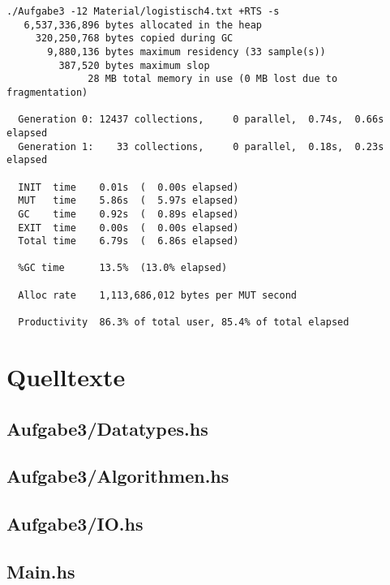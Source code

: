 \documentclass{scrreprt}
\begin{document}
\begin{verbatim}
./Aufgabe3 -12 Material/logistisch4.txt +RTS -s 
   6,537,336,896 bytes allocated in the heap
     320,250,768 bytes copied during GC
       9,880,136 bytes maximum residency (33 sample(s))
         387,520 bytes maximum slop
              28 MB total memory in use (0 MB lost due to fragmentation)

  Generation 0: 12437 collections,     0 parallel,  0.74s,  0.66s elapsed
  Generation 1:    33 collections,     0 parallel,  0.18s,  0.23s elapsed

  INIT  time    0.01s  (  0.00s elapsed)
  MUT   time    5.86s  (  5.97s elapsed)
  GC    time    0.92s  (  0.89s elapsed)
  EXIT  time    0.00s  (  0.00s elapsed)
  Total time    6.79s  (  6.86s elapsed)

  %GC time      13.5%  (13.0% elapsed)

  Alloc rate    1,113,686,012 bytes per MUT second

  Productivity  86.3% of total user, 85.4% of total elapsed
\end{verbatim}

\chapter{Quelltexte}

\section{Aufgabe3/Datatypes.hs}


\section{Aufgabe3/Algorithmen.hs}


\section{Aufgabe3/IO.hs}


\section{Main.hs}

\end{document}

